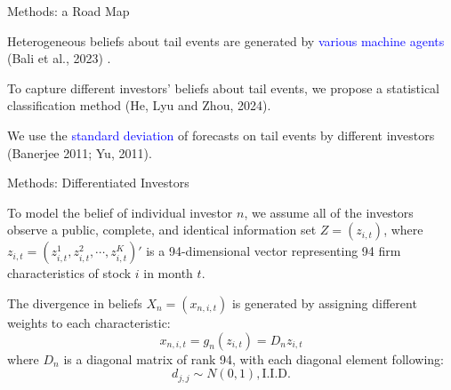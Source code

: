 \documentclass[11pt, aspectratio=169]{beamer}
\newenvironment{wideitemize}{\itemize\addtolength{\itemsep}{10pt}}{\enditemize}
\begin{document}
\begin{frame}{Methods: a Road Map}
    \bigskip
    \begin{wideitemize}
    \item Heterogeneous beliefs about tail events are generated by \textcolor{blue}{various machine agents} (Bali et al., 2023) .
    
    \item To capture different investors' beliefs about tail events, we propose a statistical \alert{classification} method (He, Lyu and Zhou, 2024).

    \item We use the \textcolor{blue}{standard deviation} of forecasts on tail events by different investors (Banerjee 2011; Yu, 2011).
    \end{wideitemize}
\end{frame}

\begin{frame}{Methods: Differentiated Investors}
    \bigskip
    \begin{wideitemize}
    \item To model the belief of individual investor $n$, we assume all of the investors observe a \alert{public, complete, and identical} information set $Z = (z_{i, t})$, where $z_{i,t}=(z_{i,t}^{1},z_{i,t}^{2},\cdots,z_{i,t}^{K})'$ is a 94-dimensional vector representing 94 firm characteristics of stock $i$ in month $t$. 
    \item The divergence in beliefs $X_{n} = (x_{n,i,t})$ is generated by assigning different weights to each characteristic:
    \begin{equation*}
        x_{n,i,t} = g_n(z_{i,t}) = D_{n}z_{i,t}
    \end{equation*}
    where $D_{n}$ is a diagonal matrix of rank 94, with each diagonal element following:
    \begin{equation*}
        d_{j,j} \sim N(0,1), \text{I.I.D.}
    \end{equation*}
    \end{wideitemize}
\end{frame}
\end{document}
